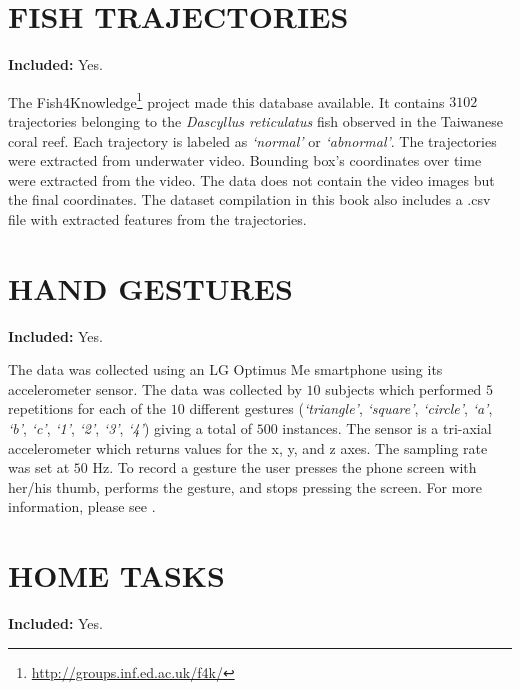\documentclass[
  11pt,
]{krantz}
\begin{document}
\hypertarget{fish-trajectories}{%
\section{FISH TRAJECTORIES}\label{fish-trajectories}}

\textbf{Included:} Yes.

The Fish4Knowledge\footnote{\url{http://groups.inf.ed.ac.uk/f4k/}} \citep{Beyan2013} project made this database available. It contains \(3102\) trajectories belonging to the \emph{Dascyllus reticulatus} fish observed in the Taiwanese coral reef. Each trajectory is labeled as \emph{`normal'} or \emph{`abnormal'}. The trajectories were extracted from underwater video. Bounding box's coordinates over time were extracted from the video. The data does not contain the video images but the final coordinates. The dataset compilation in this book also includes a .csv file with extracted features from the trajectories.

\hypertarget{hand-gestures}{%
\section{HAND GESTURES}\label{hand-gestures}}

\textbf{Included:} Yes.

The data was collected using an LG Optimus Me smartphone using its accelerometer sensor. The data was collected by \(10\) subjects which performed \(5\) repetitions for each of the \(10\) different gestures (\emph{`triangle'}, \emph{`square'}, \emph{`circle'}, \emph{`a'}, \emph{`b'}, \emph{`c'}, \emph{`1'}, \emph{`2'}, \emph{`3'}, \emph{`4'}) giving a total of \(500\) instances. The sensor is a tri-axial accelerometer which returns values for the x, y, and z axes. The sampling rate was set at \(50\) Hz. To record a gesture the user presses the phone screen with her/his thumb, performs the gesture, and stops pressing the screen. For more information, please see \citet{EnriqueGestures2014}.

\hypertarget{home-tasks}{%
\section{HOME TASKS}\label{home-tasks}}

\textbf{Included:} Yes.
\end{document}

